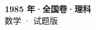 \documentclass[zihao=-4, a4paper]{ctexart}
\begin{document}
\begin{center}
  {\Large\bfseries 1985 年·全国卷·理科}\\[4pt]
  {\large 数学 · 试题版}
\end{center}
\medskip
{}

\end{document}
